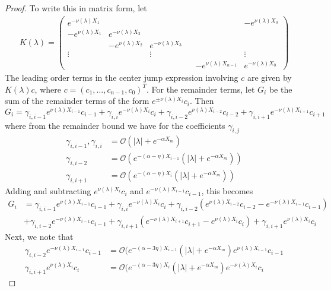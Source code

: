 \documentclass[thesis.tex]{subfiles}
\begin{document}
\begin{lemma}
\begin{proof}
To write this in matrix form, let
\begin{align*}
K(\lambda) =  
\begin{pmatrix}
e^{-\nu(\lambda)X_1} & & & & & -e^{\nu(\lambda)X_0} \\
-e^{\nu(\lambda)X_1} & e^{-\nu(\lambda)X_2} \\
& -e^{\nu(\lambda)X_2} & e^{-\nu(\lambda)X_3} \\
\vdots & & \vdots & &&  \vdots \\
& & & & -e^{\nu(\lambda)X_{n-1}} & e^{-\nu(\lambda)X_0}
\end{pmatrix}
\end{align*}
The leading order terms in the center jump expression involving $c$ are given by $K(\lambda)c$, where $c = (c_1, \dots, c_{n-1}, c_0)^T$. For the remainder terms, let $G_i$ be the sum of the remainder terms of the form $e^{\pm \nu(\lambda) X_i} c_i$. Then 
\[
G_i = \gamma_{i,i-1} e^{\nu(\lambda)X_{i-1}}c_{i-1} + \gamma_{i,i} e^{-\nu(\lambda)X_i}c_i + \gamma_{i,i-2} e^{\nu(\lambda)X_{i-2}}c_{i-2} + \gamma_{i,i+1} e^{-\nu(\lambda)X_{i+1}}c_{i+1}
\] 
where from the remainder bound we have for the coefficients $\gamma_{i, j}$
\begin{align*}
\gamma_{i,i-1}, \gamma_{i,i} &= \mathcal{O}(|\lambda| + e^{-\alpha X_m}) \\
\gamma_{i,i-2} &= \mathcal{O}(e^{-(\alpha - \eta) X_{i-1}}(|\lambda| + e^{-\alpha X_m})) \\
\gamma_{i,i+1} &= \mathcal{O}(e^{-(\alpha - \eta) X_i}(|\lambda| + e^{-\alpha X_m}))
\end{align*}
Adding and subtracting $e^{\nu(\lambda)X_i}c_i$ and $e^{-\nu(\lambda)X_{i-1}}c_{i-1}$, this becomes
\begin{align*}
G_i &= \gamma_{i,i-1} e^{\nu(\lambda)X_{i-1}}c_{i-1} + \gamma_{i,i} e^{-\nu(\lambda)X_i}c_i + \gamma_{i,i-2} ( e^{\nu(\lambda)X_{i-2}}c_{i-2} - e^{-\nu(\lambda)X_{i-1}}c_{i-1}) \\
&+ \gamma_{i,i-2} e^{-\nu(\lambda)X_{i-1}}c_{i-1} + \gamma_{i,i+1} (e^{-\nu(\lambda)X_{i+1}}c_{i+1} - e^{\nu(\lambda)X_i}c_i) + \gamma_{i,i+1} e^{\nu(\lambda)X_i}c_i
\end{align*}
Next, we note that
\begin{align*}
\gamma_{i,i-2} e^{-\nu(\lambda)X_{i-1}}c_{i-1} &= \mathcal{O}(e^{-(\alpha - 3 \eta) X_{i-1}}(|\lambda| + e^{-\alpha X_m})e^{\nu(\lambda)X_{i-1}}c_{i-1} \\
\gamma_{i,i+1} e^{\nu(\lambda)X_i}c_i &= \mathcal{O}(e^{-(\alpha - 3 \eta) X_i}(|\lambda| + e^{-\alpha X_m})e^{-\nu(\lambda)X_i}c_i

\end{align*}
\end{proof}
\end{lemma}
\end{document}
